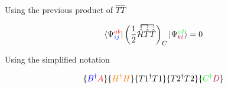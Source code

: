 \documentclass{beamer}
\begin{document}
\begin{frame}
\begin{footnotesize}
Using the previous  product of  $\hat{T}\hat{T}$ 

\[
\langle \Psi^{\textcolor{red}{ab}}_{\textcolor{blue}{ij}} |  \left(
 \frac{1}{2}\contraction{}{ \bar{11}}{}{\bar{1}} 
    \contraction{} { \bar{11}}{1}{ {\hat{11}}} 
 \hat{\mathcal{H}} \hat{T} \hat{T} 
 \right)_{C}|\Psi^{\textcolor{green}{cd}}_{\textcolor{purple}{kl}}  \rangle = 0
\]

Using the simplified notation

\[
\{
\textcolor{blue}{B^{\dagger}}
\textcolor{red}{A}
\}
\{
\textcolor{orange}{H^{\dagger}}\textcolor{orange}{H}
\}
\{
T1^{\dagger}
T1
\}
\{
T2^{\dagger}
T2
\}
\{
\textcolor{green}{C^{\dagger}}
\textcolor{purple}{D}
\}
\]

\end{footnotesize}
\end{frame}
\end{document}
